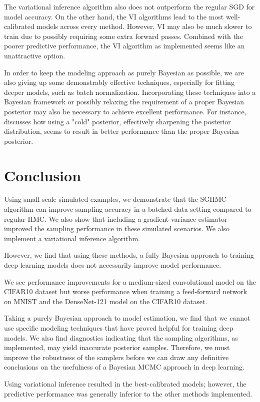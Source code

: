 The variational inference algorithm also does not outperform the regular SGD for model accuracy. 
On the other hand, the VI algorithms lead to the most well-calibrated models across every method. 
However, VI may also be much slower to train due to possibly requiring some extra forward passes.
Combined with the poorer predictive performance, the VI algorithm as implemented seems like an unattractive option.

In order to keep the modeling approach as purely Bayesian as possible, we are also giving up some demonstrably effective techniques, especially for fitting deeper models, such as batch normalization.
Incorporating these techniques into a Bayesian framework or possibly relaxing the requirement of a proper Bayesian posterior may also be necessary to achieve excellent performance.
For instance, \autocite{wenzel_how_2020} discusses how using a "cold" posterior, effectively sharpening the posterior distribution, seems to result in better performance than the proper Bayesian posterior.


\chapter{Conclusion}

Using small-scale simulated examples, we demonstrate that the SGHMC algorithm can improve sampling accuracy in a batched data setting compared to regular HMC.
We also show that including a gradient variance estimator improved the sampling performance in these simulated scenarios.
We also implement a variational inference algorithm.

However, we find that using these methods, a fully Bayesian approach to training deep learning models does not necessarily improve model performance.

We see performance improvements for a medium-sized convolutional model on the CIFAR10 dataset but worse performance when training a feed-forward network on MNIST and the DenseNet-121 model on the CIFAR10 dataset.

Taking a purely Bayesian approach to model estimation, we find that we cannot use specific modeling techniques that have proved helpful for training deep models. 
We also find diagnostics indicating that the sampling algorithms, as implemented, may yield inaccurate posterior samples.
Therefore, we must improve the robustness of the samplers before we can draw any definitive conclusions on the usefulness of a Bayesian MCMC approach in deep learning.

Using variational inference resulted in the best-calibrated models; however, the predictive performance was generally inferior to the other methods implemented.
